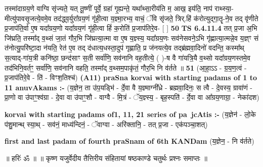 \documentclass[17pt]{extarticle}
\begin{document}
                  तस्मा॑दाग्रय॒णे वाग्वि सृ॑ज्यते॒ यत् तू॒ष्णीं पूर्वे॒ ग्रहा॑ गृ॒ह्यन्ते॒ यथा᳚थ्सा॒रीय॑ति म॒ आख॒ इय॑ति॒ नाप॑ राथ्स्या॒-मीत्यु॑पावसृ॒जत्ये॒वमे॒व तद॑द्ध्व॒र्युरा᳚ग्रय॒णं गृ॑ही॒त्वा य॒ज्ञ्मा॒रभ्य॒ वाचं॒ ॅवि सृ॑जते॒ त्रिर्.हिं क॑रोत्युद्गा॒तॄ-ने॒व तद् वृ॑णीते प्र॒जाप॑ति॒र्वा ए॒ष यदा᳚ग्रय॒णो यदा᳚ग्रय॒णं गृ॑ही॒त्वा हिं॑ क॒रोति॑ प्र॒जाप॑तिरे॒व- [  ] \textbf{  50} \newline
                  \newline
                                \textbf{ TS 6.4.11.4} \newline
                  तत् प्र॒जा अ॒भि जि॑घ्रति॒ तस्मा᳚द् व॒थ्सं जा॒तं गौर॒भि जि॑घ्रत्या॒त्मा वा ए॒ष य॒ज्ञ्स्य॒ यदा᳚ग्रय॒णः सव॑नेसवने॒ऽभि गृ॑ह्णात्या॒त्मन्ने॒व य॒ज्ञ्ꣳ सं त॑नोत्यु॒परि॑ष्टा॒दा न॑यति॒ रेत॑ ए॒व तद् द॑धात्य॒धस्ता॒दुप॑ गृह्णाति॒ प्र ज॑नयत्ये॒व तद्ब्र॑ह्मवा॒दिनो॑ वदन्ति॒ कस्मा᳚थ् स॒त्याद्-गा॑य॒त्री कनि॑ष्ठा॒ छन्द॑साꣳ स॒ती सर्वा॑णि॒ सव॑नानि वह॒तीत्ये॒ ( )-ष वै गा॑यत्रि॒यै व॒थ्सो यदा᳚ग्रय॒णस्तमे॒व तद॑भिनि॒वर्तꣳ॒॒ सर्वा॑णि॒ सव॑नानि वहति॒ तस्मा᳚द् व॒थ्सम॒पाकृ॑तं॒ गौर॒भि नि व॑र्तते ॥ \textbf{  51} \newline
                  \newline
                      (आ॒हा॒ऽऽ - ग्र॒य॒ण॒त्वं - प्र॒जाप॑तिरे॒वे - ति॑ - विꣳश॒तिश्च॑)  \textbf{(A11)} \newline \newline
                \textbf{praSna korvai with starting padams of 1 to 11 anuvAkams :-} \newline
        (य॒ज्ञेन॒ ता उ॑प॒यड्भि॑ - र्दे॒वा वै य॒ज्ञ्माग्नी᳚ध्रे - ब्रह्मवा॒दिनः॒ स त्वै - दे॒वस्य॒ ग्रावा॑णं - प्रा॒णो वा उ॑पाꣳ॒॒श्व॑ग्रा - दे॒वा वा उ॑पाꣳ॒॒शौ - वाग्वै - मि॒त्रं - ॅय॒ज्ञ्स्य॒ - बृह॒स्पति॑ - र्दे॒वा वा आ᳚ग्रय॒णाग्रा॒ - नेका॑दश) \newline

        \textbf{korvai with starting padams of1, 11, 21 series of pa~jcAtis :-} \newline
        (य॒ज्ञेन॑ - लो॒के प॑शु॒मान्थ् स्या॒थ् - सव॑नं॒ माध्य॑न्दिनं॒ - ॅवाग्वा - अरि॑क्तानि॒ - तत् प्र॒जा - एक॑पञ्चा॒शत्) \newline

        \textbf{first and last padam of fourth praSnam of 6th KANDam} \newline
        (य॒ज्ञेन॒ - नि व॑र्तते) \newline 

        
        ॥ हरिः॑ ॐ ॥
॥ कृष्ण यजुर्वेदीय तैत्तिरीय संहितायां षष्ठकाण्डे चतुर्थः प्रश्नः समाप्तः ॥ \newline
        \pagebreak
                \pagebreak
        
\end{document}
